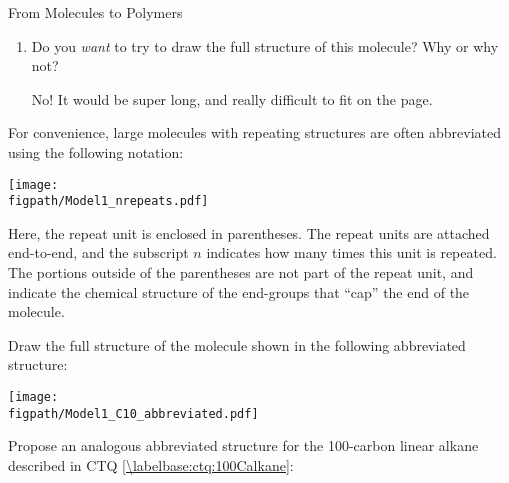 \begin{activity}{From Molecules to Polymers}
\begin{ctqs}
\begin{enumerate}
			\item Do you \emph{want} to try to draw the full structure of this molecule?  Why or why not?
			
				\begin{solution}[1.25in]
					No!  It would be super long, and really difficult to fit on the page.
				\end{solution}
		\end{enumerate}
\end{ctqs}

\begin{infobox}
	For convenience, large molecules with repeating structures are often abbreviated using the following notation:
	
	\centerline{\texttt{[image: \\figpath/Model1\_nrepeats.pdf]}}
	
	Here, the repeat unit is enclosed in parentheses.  The repeat units are attached end-to-end, and the subscript $n$ indicates how many times this unit is repeated.  The portions outside of the parentheses are not part of the repeat unit, and indicate the chemical structure of the end-groups that ``cap'' the end of the molecule.
\end{infobox}

\begin{ctqs}
	\question Draw the full structure of the molecule shown in the following abbreviated structure: \label{\labelbase:ctq:abbrevbutane}
	
		\vspace{6pt}
		\centerline{\texttt{[image: \\figpath/Model1\_C10\_abbreviated.pdf]}}
		
		\begin{solution}[1.25in]
		\end{solution}
	
	\question Propose an analogous abbreviated structure for the 100-carbon linear alkane described in CTQ \ref{\labelbase:ctq:100Calkane}: \label{\labelbase:ctq:abbrev100}
		
		\begin{solution}[0.75in]
			\studentdisplay{~}
		\end{solution}
	

\end{ctqs}
\end{activity}
